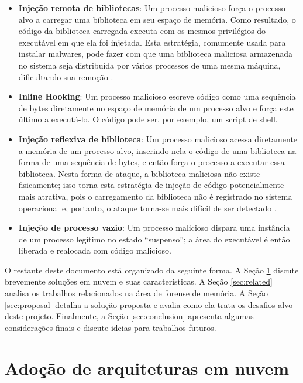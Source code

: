 \documentclass[conference]{IEEEtran}
\begin{document}
\begin{itemize}
 \item \textbf{Injeção remota de bibliotecas}: Um processo malicioso força o processo alvo a carregar uma biblioteca em seu espaço de memória.
 Como resultado, o código da biblioteca carregada executa com os mesmos privilégios do executável em que ela foi injetada. 
 Esta estratégia, comumente usada para instalar malwares, pode fazer com que uma biblioteca maliciosa armazenada no sistema seja distribuída por vários processos de uma mesma máquina, dificultando sua remoção \cite{Miller2004}.
 \item \textbf{Inline Hooking}: Um processo malicioso escreve código como uma sequência de bytes diretamente no espaço de memória de um processo alvo e força este último a executá-lo. 
 O código pode ser, por exemplo, um script de shell.
 \item \textbf{Injeção reflexiva de biblioteca}: Um processo malicioso acessa diretamente a memória de um processo alvo, inserindo nela o código de uma biblioteca na forma de uma sequência de bytes, e então força o processo a executar essa biblioteca. 
 Nesta forma de ataque, a biblioteca maliciosa não existe fisicamente; isso torna esta estratégia de injeção de código potencialmente mais atrativa, pois o carregamento da biblioteca não é registrado no sistema operacional e, portanto, o ataque torna-se mais difícil de ser detectado \cite{Fewer2008}.
 \item \textbf{Injeção de processo vazio}: Um processo malicioso dispara uma instância de um processo legítimo no estado ``suspenso''; a área do executável é então liberada e realocada com código malicioso.
\end{itemize}


O restante deste documento está organizado da seguinte forma.
%
A Seção \ref{sec:cloud} discute brevemente soluções em nuvem e suas características.
%
A Seção \ref{sec:related} analisa os trabalhos relacionados na área de forense de memória.
%
A Seção \ref{sec:proposal} detalha a solução proposta e avalia como ela trata os desafios alvo deste projeto.
%
Finalmente, a Seção \ref{sec:conclusion} apresenta algumas considerações finais e discute ideias para trabalhos futuros.


\section{Adoção de arquiteturas em nuvem}
\label{sec:cloud}
\end{document}
